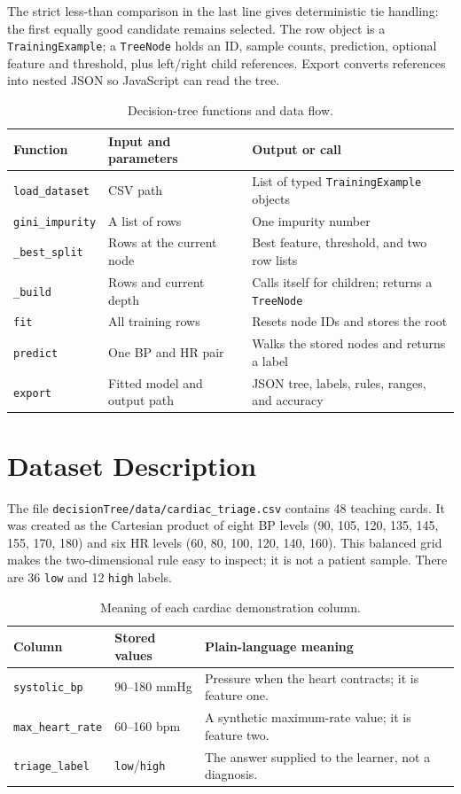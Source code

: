 \documentclass[12pt,a4paper,openany]{report}
\newcommand{\sourcepath}[1]{\texttt{#1}}
\begin{document}
The strict less-than comparison in the last line gives deterministic tie
handling: the first equally good candidate remains selected. The row object is
a \texttt{TrainingExample}; a \texttt{TreeNode} holds an ID, sample counts,
prediction, optional feature and threshold, plus left/right child references.
Export converts references into nested JSON so JavaScript can read the tree.

\begin{table}[H]
\centering
\caption{Decision-tree functions and data flow.}
\begin{tabularx}{\textwidth}{p{}YY}
\toprule
\textbf{Function} & \textbf{Input and parameters} & \textbf{Output or call} \\
\midrule
\texttt{load\_dataset} & CSV path & List of typed \texttt{TrainingExample} objects \\
\texttt{gini\_impurity} & A list of rows & One impurity number \\
\texttt{\_best\_split} & Rows at the current node & Best feature, threshold, and two row lists \\
\texttt{\_build} & Rows and current depth & Calls itself for children; returns a \texttt{TreeNode} \\
\texttt{fit} & All training rows & Resets node IDs and stores the root \\
\texttt{predict} & One BP and HR pair & Walks the stored nodes and returns a label \\
\texttt{export} & Fitted model and output path & JSON tree, labels, rules, ranges, and accuracy \\
\bottomrule
\end{tabularx}
\end{table}

\section{Dataset Description}
The file \sourcepath{decisionTree/data/cardiac\_triage.csv} contains 48 teaching
cards. It was created as the Cartesian product of eight BP levels (90, 105,
120, 135, 145, 155, 170, 180) and six HR levels (60, 80, 100, 120, 140, 160).
This balanced grid makes the two-dimensional rule easy to inspect; it is not a
patient sample. There are 36 \texttt{low} and 12 \texttt{high} labels.

\begin{table}[H]
\centering
\caption{Meaning of each cardiac demonstration column.}
\begin{tabularx}{\textwidth}{p{}p{}Y}
\toprule
\textbf{Column} & \textbf{Stored values} & \textbf{Plain-language meaning} \\
\midrule
\texttt{systolic\_bp} & 90--180 mmHg & Pressure when the heart contracts; it is feature one. \\
\texttt{max\_heart\_rate} & 60--160 bpm & A synthetic maximum-rate value; it is feature two. \\
\texttt{triage\_label} & \texttt{low}/\texttt{high} & The answer supplied to the learner, not a diagnosis. \\
\bottomrule
\end{tabularx}
\end{table}
\end{document}
